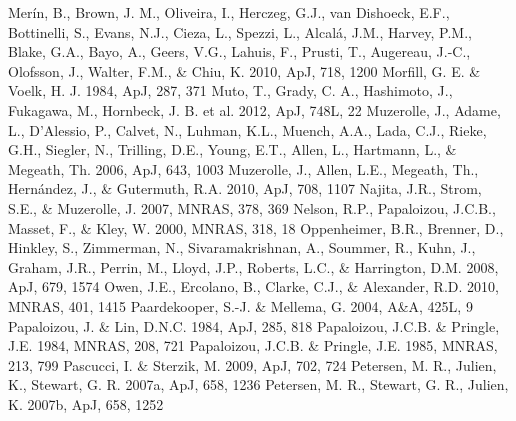 \documentclass[apj]{emulateapj}
\begin{document}
\begin{thebibliography}{}
 Mer\'in, B., Brown, J. M., Oliveira, I., Herczeg, G.J., van Dishoeck, E.F., Bottinelli, S., Evans, N.J., Cieza, L., Spezzi, L., Alcal\'a, J.M., Harvey, P.M., Blake, G.A., Bayo, A., Geers, V.G., Lahuis, F., Prusti, T., Augereau, J.-C., Olofsson, J., Walter, F.M., \& Chiu, K. 2010, ApJ, 718, 1200
 Morfill, G. E. \& Voelk, H. J. 1984, ApJ, 287, 371
 Muto, T., Grady, C. A., Hashimoto, J., Fukagawa, M., Hornbeck, J. B. et al. 2012, ApJ, 748L, 22
 Muzerolle, J., Adame, L., D'Alessio, P., Calvet, N., Luhman, K.L., Muench, A.A., Lada, C.J., Rieke, G.H., Siegler, N., Trilling, D.E., Young, E.T., Allen, L., Hartmann, L., \& Megeath, Th. 2006, ApJ, 643, 1003
 Muzerolle, J., Allen, L.E., Megeath, Th., Hern\'andez, J., \& Gutermuth, R.A. 2010, ApJ, 708, 1107
 Najita, J.R., Strom, S.E., \& Muzerolle, J. 2007, MNRAS, 378, 369
 Nelson, R.P., Papaloizou, J.C.B., Masset, F., \& Kley, W. 2000, MNRAS, 318, 18
 Oppenheimer, B.R., Brenner, D., Hinkley, S., Zimmerman, N., Sivaramakrishnan, A., Soummer, R., Kuhn, J., Graham, J.R., Perrin, M., Lloyd, J.P., Roberts, L.C., \& Harrington, D.M. 2008, ApJ, 679, 1574
 Owen, J.E., Ercolano, B., Clarke, C.J., \& Alexander, R.D. 2010, MNRAS, 401, 1415
 Paardekooper, S.-J. \& Mellema, G.	2004, A\&A, 425L, 9
 Papaloizou, J. \& Lin, D.N.C. 1984, ApJ, 285, 818
 Papaloizou, J.C.B. \& Pringle, J.E. 1984, MNRAS, 208, 721
 Papaloizou, J.C.B. \& Pringle, J.E. 1985, MNRAS, 213, 799
 Pascucci, I. \& Sterzik, M. 2009, ApJ, 702, 724
 Petersen, M. R., Julien, K., Stewart, G. R. 2007a, ApJ, 658, 1236
 Petersen, M. R., Stewart, G. R., Julien, K. 2007b, ApJ, 658, 1252

\end{thebibliography}
\end{document}
